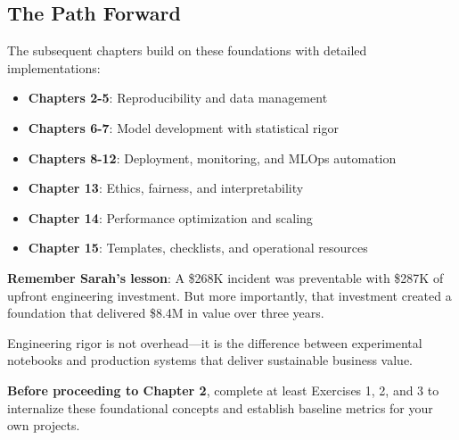 \subsection{The Path Forward}

The subsequent chapters build on these foundations with detailed implementations:

\begin{itemize}
    \item \textbf{Chapters 2-5}: Reproducibility and data management
    \item \textbf{Chapters 6-7}: Model development with statistical rigor
    \item \textbf{Chapters 8-12}: Deployment, monitoring, and MLOps automation
    \item \textbf{Chapter 13}: Ethics, fairness, and interpretability
    \item \textbf{Chapter 14}: Performance optimization and scaling
    \item \textbf{Chapter 15}: Templates, checklists, and operational resources
\end{itemize}

\textbf{Remember Sarah's lesson}: A \$268K incident was preventable with \$287K of upfront engineering investment. But more importantly, that investment created a foundation that delivered \$8.4M in value over three years.

Engineering rigor is not overhead---it is the difference between experimental notebooks and production systems that deliver sustainable business value.

\vspace{1cm}

\textbf{Before proceeding to Chapter 2}, complete at least Exercises 1, 2, and 3 to internalize these foundational concepts and establish baseline metrics for your own projects.

